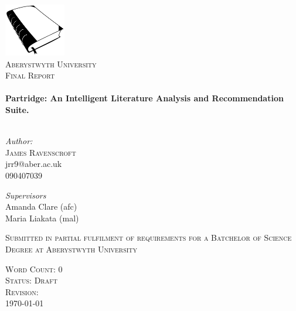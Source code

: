 \begin{titlepage}
 
\begin{center}

\includegraphics[width=0.20\textwidth]{../cover_logo.png}\\[1cm]


\textsc{\LARGE Aberystwyth University}\\[0.5cm]
\textsc{\LARGE Final Report}\\[0.5cm]



 
\HRule \\[0.4cm]
{ \huge \bfseries Partridge: An Intelligent Literature Analysis and
Recommendation Suite.}\\[0.4cm]

\HRule \\[1.5cm]

\begin{minipage}{0.4\textwidth}
\begin{flushleft} \large
\emph{Author:}\\
\textsc{James Ravenscroft}\\
jrr9@aber.ac.uk\\
090407039\\
\end{flushleft}
\end{minipage}
\begin{minipage}{0.4\textwidth}
\begin{flushright} \large
\emph{Supervisors} \\
Amanda Clare (afc)\\
Maria Liakata (mal)

\end{flushright}
\end{minipage}


\vfill

\textsc{Submitted in partial fulfilment of requirements for a Batchelor of
Science Degree at Aberystwyth University}



\vfill
 
\textsc{\large Word Count: 0}\\
\textsc{\large Status: Draft}\\
\textsc{\large Revision: \Revision{} }\\
{\large \today}
 
\end{center}
 
\end{titlepage}

